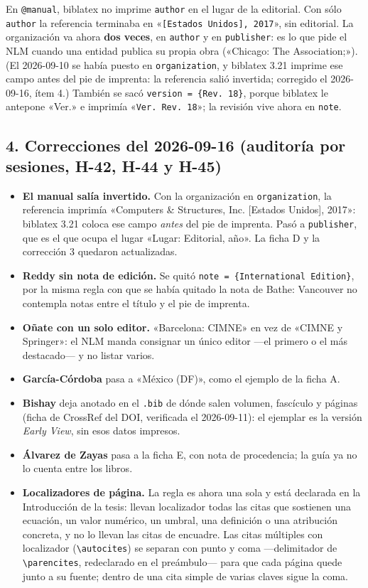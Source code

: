 \documentclass[11pt,a4paper]{article}
\begin{document}
En \texttt{@manual}, biblatex no imprime \texttt{author} en el lugar de la editorial. Con sólo
\texttt{author} la referencia terminaba en «\texttt{[Estados Unidos], 2017}», sin editorial. La
organización va ahora \textbf{dos veces}, en \texttt{author} y en \texttt{publisher}: es lo que
pide el NLM cuando una entidad publica su propia obra («Chicago: The Association;»). (El
2026-09-10 se había puesto en \texttt{organization}, y biblatex 3.21 imprime ese campo antes
del pie de imprenta: la referencia salió invertida; corregido el 2026-09-16, ítem 4.)
También se sacó \texttt{version = \{Rev. 18\}}, porque biblatex le antepone «Ver.» e imprimía
«\texttt{Ver. Rev. 18}»; la revisión vive ahora en \texttt{note}.

\subsection*{4. Correcciones del 2026-09-16 (auditoría por sesiones, H-42, H-44 y H-45)}

\begin{itemize}\setlength{\itemsep}{3pt}
\item \textbf{El manual salía invertido.} Con la organización en \texttt{organization}, la
  referencia imprimía «Computers \& Structures, Inc. [Estados Unidos], 2017»: biblatex 3.21
  coloca ese campo \emph{antes} del pie de imprenta. Pasó a \texttt{publisher}, que es el
  que ocupa el lugar «Lugar: Editorial, año». La ficha D y la corrección 3 quedaron
  actualizadas.
\item \textbf{Reddy sin nota de edición.} Se quitó \texttt{note = \{International Edition\}},
  por la misma regla con que se había quitado la nota de Bathe: Vancouver no contempla notas
  entre el título y el pie de imprenta.
\item \textbf{Oñate con un solo editor.} «Barcelona: CIMNE» en vez de «CIMNE y Springer»: el
  NLM manda consignar un único editor —el primero o el más destacado— y no listar varios.
\item \textbf{García-Córdoba} pasa a «México (DF)», como el ejemplo de la ficha A.
\item \textbf{Bishay} deja anotado en el \texttt{.bib} de dónde salen volumen, fascículo y
  páginas (ficha de CrossRef del DOI, verificada el 2026-09-11): el ejemplar es la versión
  \emph{Early View}, sin esos datos impresos.
\item \textbf{Álvarez de Zayas} pasa a la ficha E, con nota de procedencia; la guía ya no lo
  cuenta entre los libros.
\item \textbf{Localizadores de página.} La regla es ahora una sola y está declarada en la
  Introducción de la tesis: llevan localizador todas las citas que sostienen una ecuación, un
  valor numérico, un umbral, una definición o una atribución concreta, y no lo llevan las
  citas de encuadre. Las citas múltiples con localizador (\texttt{\textbackslash autocites}) se separan con punto
  y coma —delimitador de \texttt{\textbackslash parencites}, redeclarado en el preámbulo— para que
  cada página quede junto a su fuente; dentro de una cita simple de varias claves sigue la coma.
\end{itemize}
\end{document}
